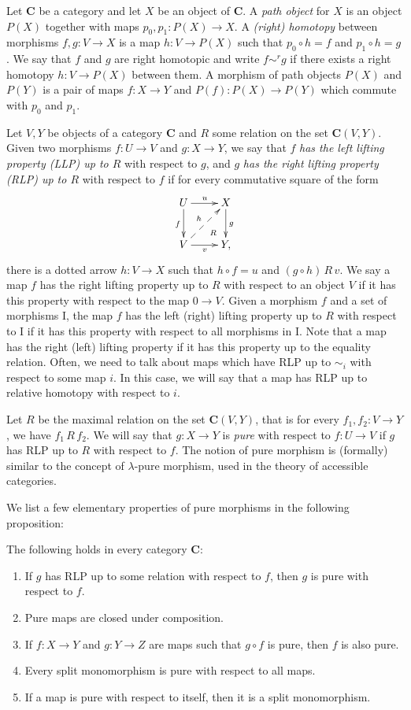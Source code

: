 \documentclass{tac}
\theoremstyle{definition}
\newcommand{\cat}[1]{\mathbf{#1}}
\newcommand{\C}{\cat{C}}
\newcommand{\I}{\mathrm{I}}
\begin{document}
Let $\C$ be a category and let $X$ be an object of $\C$.
A \emph{path object} for $X$ is an object $P(X)$ together with maps $p_0,p_1 : P(X) \to X$.
A \emph{(right) homotopy} between morphisms $f,g : V \to X$ is a map
$h : V \to P(X)$ such that $p_0 \circ h = f$ and $p_1 \circ h = g$.
We say that $f$ and $g$ are right homotopic and write $f \sim^r g$
if there exists a right homotopy $h : V \to P(X)$ between them.
A morphism of path objects $P(X)$ and $P(Y)$ is a pair of maps $f : X \to Y$ and $P(f) : P(X) \to P(Y)$ which commute with $p_0$ and $p_1$.

Let $V,Y$ be objects of a category $\C$ and $R$ some relation on the set $\C(V,Y)$.
Given two morphisms $f : U \to V$ and $g : X \to Y$, we say that $f$ \emph{has the left lifting property (LLP) up to $R$} with respect to $g$,
and $g$ \emph{has the right lifting property (RLP) up to $R$} with respect to $f$ if for every commutative square of the form
\[ \xymatrix{ U \ar[r]^u \ar@{}[dr]|(.7){R} \ar[d]_f & X \ar[d]^g \\
              V \ar[r]_v \ar@{-->}[ur]^h             & Y,
            } \]
there is a dotted arrow $h : V \to X$ such that $h \circ f = u$ and $(g \circ h)\,R\,v$.
We say a map $f$ has the right lifting property up to $R$ with respect to
an object $V$ if it has this property with respect to the map $0 \to V$.
Given a morphism $f$ and a set of morphisms $\I$, the map $f$ has the left (right) lifting property up to $R$
with respect to $\I$ if it has this property with respect to all morphisms in $\I$.
Note that a map has the right (left) lifting property if it has this property up to the equality relation.
Often, we need to talk about maps which have RLP up to $\sim_i$ with respect to some map $i$.
In this case, we will say that a map has RLP up to relative homotopy with respect to $i$.

Let $R$ be the maximal relation on the set $\C(V,Y)$, that is for every $f_1,f_2 : V \to Y$, we have $f_1\,R\,f_2$.
We will say that $g : X \to Y$ is \emph{pure} with respect to $f : U \to V$ if $g$ has RLP up to $R$ with respect to $f$.
The notion of pure morphism is (formally) similar to the concept of
$\lambda$-pure morphism, used in the theory of accessible categories.

We list a few elementary properties of pure morphisms in the following proposition:

\begin{prop} The following holds in every category $\C$:
\begin{enumerate}
\item If $g$ has RLP up to some relation with respect to $f$, then $g$ is pure with respect to $f$.
\item Pure maps are closed under composition.
\item If $f : X \to Y$ and $g : Y \to Z$ are maps such that $g \circ f$ is pure, then $f$ is also pure.
\item Every split monomorphism is pure with respect to all maps.
\item If a map is pure with respect to itself, then it is a split monomorphism.
\end{enumerate}
\end{prop}
\end{document}
